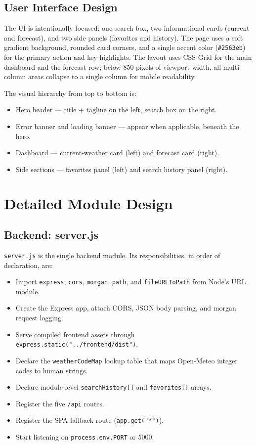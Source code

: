 \documentclass[11pt,letterpaper]{article}
\begin{document}
\subsection{User Interface Design}
The UI is intentionally focused: one search box, two informational cards (current and forecast), and two side panels (favorites and history). The page uses a soft gradient background, rounded card corners, and a single accent color (\texttt{\#2563eb}) for the primary action and key highlights. The layout uses CSS Grid for the main dashboard and the forecast row; below 850 pixels of viewport width, all multi-column areas collapse to a single column for mobile readability.

The visual hierarchy from top to bottom is:
\begin{itemize}
  \item Hero header --- title + tagline on the left, search box on the right.
  \item Error banner and loading banner --- appear when applicable, beneath the hero.
  \item Dashboard --- current-weather card (left) and forecast card (right).
  \item Side sections --- favorites panel (left) and search history panel (right).
\end{itemize}

\section{Detailed Module Design}

\subsection{Backend: server.js}
\texttt{server.js} is the single backend module. Its responsibilities, in order of declaration, are:
\begin{itemize}
  \item Import \texttt{express}, \texttt{cors}, \texttt{morgan}, \texttt{path}, and \texttt{fileURLToPath} from Node's URL module.
  \item Create the Express app, attach CORS, JSON body parsing, and morgan request logging.
  \item Serve compiled frontend assets through \texttt{express.static("../frontend/dist")}.
  \item Declare the \texttt{weatherCodeMap} lookup table that maps Open-Meteo integer codes to human strings.
  \item Declare module-level \texttt{searchHistory[]} and \texttt{favorites[]} arrays.
  \item Register the five \texttt{/api} routes.
  \item Register the SPA fallback route (\texttt{app.get("*")}).
  \item Start listening on \texttt{process.env.PORT} or 5000.
\end{itemize}
\end{document}
